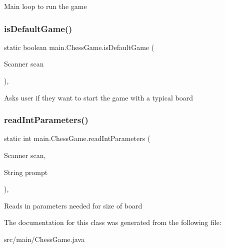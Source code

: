 Main loop to run the game \mbox{\label{classmain_1_1_chess_game_a522322a2f8481f1707e430f742cec611}} 
\subsubsection{\texorpdfstring{is\+Default\+Game()}{isDefaultGame()}}
{\footnotesize\ttfamily static boolean main.\+Chess\+Game.\+is\+Default\+Game (\begin{DoxyParamCaption}\item[{Scanner}]{scan }\end{DoxyParamCaption})\hspace{0.3cm}{\ttfamily [inline]}, {\ttfamily [static]}}

Asks user if they want to start the game with a typical board \mbox{\label{classmain_1_1_chess_game_a544d67af18a48fb13caf01ba9c5e2fda}} 
\subsubsection{\texorpdfstring{read\+Int\+Parameters()}{readIntParameters()}}
{\footnotesize\ttfamily static int main.\+Chess\+Game.\+read\+Int\+Parameters (\begin{DoxyParamCaption}\item[{Scanner}]{scan,  }\item[{String}]{prompt }\end{DoxyParamCaption})\hspace{0.3cm}{\ttfamily [inline]}, {\ttfamily [static]}}

Reads in parameters needed for size of board 

The documentation for this class was generated from the following file\+:\begin{DoxyCompactItemize}
\item 
src/main/Chess\+Game.\+java\end{DoxyCompactItemize}
